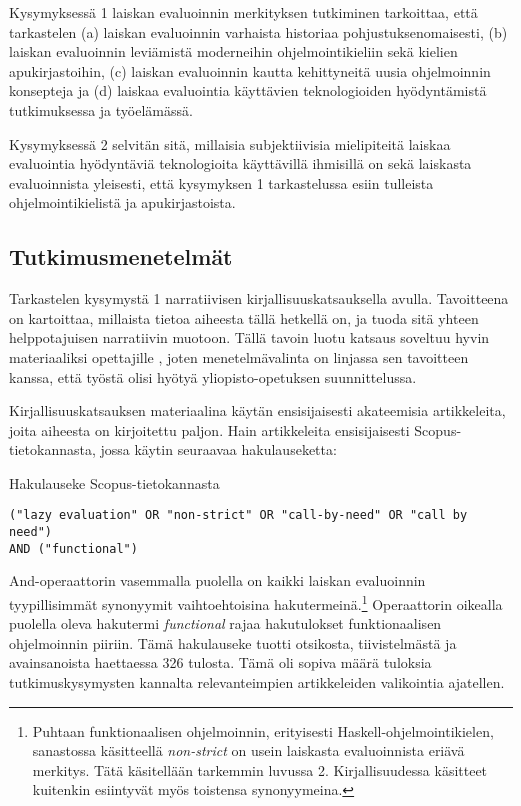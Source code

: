 Kysymyksessä 1 laiskan evaluoinnin merkityksen tutkiminen tarkoittaa, että tarkastelen (a) laiskan evaluoinnin varhaista historiaa pohjustuksenomaisesti, (b) laiskan evaluoinnin leviämistä moderneihin ohjelmointikieliin sekä kielien apukirjastoihin, (c) laiskan evaluoinnin kautta kehittyneitä uusia ohjelmoinnin konsepteja ja (d) laiskaa evaluointia käyttävien teknologioiden hyödyntämistä tutkimuksessa ja työelämässä.

Kysymyksessä 2 selvitän sitä, millaisia subjektiivisia mielipiteitä laiskaa evaluointia hyödyntäviä teknologioita käyttävillä ihmisillä on sekä laiskasta evaluoinnista yleisesti, että kysymyksen 1 tarkastelussa esiin tulleista ohjelmointikielistä ja apukirjastoista.

\subsection{Tutkimusmenetelmät}

Tarkastelen kysymystä 1 narratiivisen kirjallisuuskatsauksella avulla. Tavoitteena on kartoittaa, millaista tietoa aiheesta tällä hetkellä on, ja tuoda sitä yhteen helppotajuisen narratiivin muotoon. Tällä tavoin luotu katsaus soveltuu hyvin materiaaliksi opettajille \citep[s. 312]{baumeister1997writing}, joten menetelmävalinta on linjassa sen tavoitteen kanssa, että työstä olisi hyötyä yliopisto-opetuksen suunnittelussa.

Kirjallisuuskatsauksen materiaalina käytän ensisijaisesti akateemisia artikkeleita, joita aiheesta on kirjoitettu paljon. Hain artikkeleita ensisijaisesti Scopus-tietokannasta, jossa käytin seuraavaa hakulauseketta:

\begin{listing}[H]
  \caption{Hakulauseke Scopus-tietokannasta}
  \bigskip
  \begin{verbatim}
("lazy evaluation" OR "non-strict" OR "call-by-need" OR "call by need")
AND ("functional")
  \end{verbatim}
\end{listing}

And-operaattorin vasemmalla puolella on kaikki laiskan evaluoinnin tyypillisimmät synonyymit vaihtoehtoisina hakutermeinä.\footnote{Puhtaan funktionaalisen ohjelmoinnin, erityisesti Haskell-ohjelmointikielen, sanastossa käsitteellä \textit{non-strict} on usein laiskasta evaluoinnista eriävä merkitys. Tätä käsitellään tarkemmin luvussa 2. Kirjallisuudessa käsitteet kuitenkin esiintyvät myös toistensa synonyymeina.} Operaattorin oikealla puolella oleva hakutermi \textit{functional} rajaa hakutulokset funktionaalisen ohjelmoinnin piiriin. Tämä hakulauseke tuotti otsikosta, tiivistelmästä ja avainsanoista haettaessa 326 tulosta. Tämä oli sopiva määrä tuloksia tutkimuskysymysten kannalta relevanteimpien artikkeleiden valikointia ajatellen.

